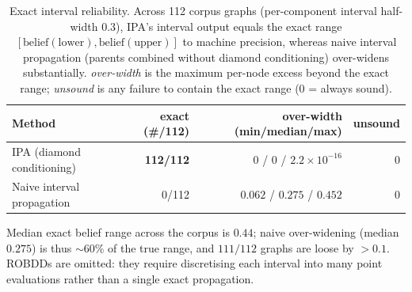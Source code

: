 
\begin{table}[t]
\centering
\caption{Exact interval reliability. Across 112 corpus graphs (per-component interval half-width $0.3$),
IPA's interval output equals the exact range $[\text{belief}(\text{lower}),\text{belief}(\text{upper})]$
to machine precision, whereas naive interval propagation (parents combined without diamond conditioning)
over-widens substantially. \emph{over-width} is the maximum per-node excess beyond the exact range;
\emph{unsound} is any failure to contain the exact range (0 = always sound).}
\label{tab:imprecise}
\begin{tabular}{lrrr}
\hline
Method & exact (\#/112) & over-width (min/median/max) & unsound \\
\hline
IPA (diamond conditioning) & \textbf{112/112} & $0$ / $0$ / $2.2\times10^{-16}$ & $0$ \\
Naive interval propagation & 0/112 & $0.062$ / $0.275$ / $0.452$ & $0$ \\
\hline
\end{tabular}
\par\smallskip
\footnotesize Median exact belief range across the corpus is $0.44$; naive over-widening (median $0.275$)
is thus $\sim 60\%$ of the true range, and $111/112$ graphs are loose by $>0.1$. ROBDDs are omitted: they
require discretising each interval into many point evaluations rather than a single exact propagation.
\end{table}

